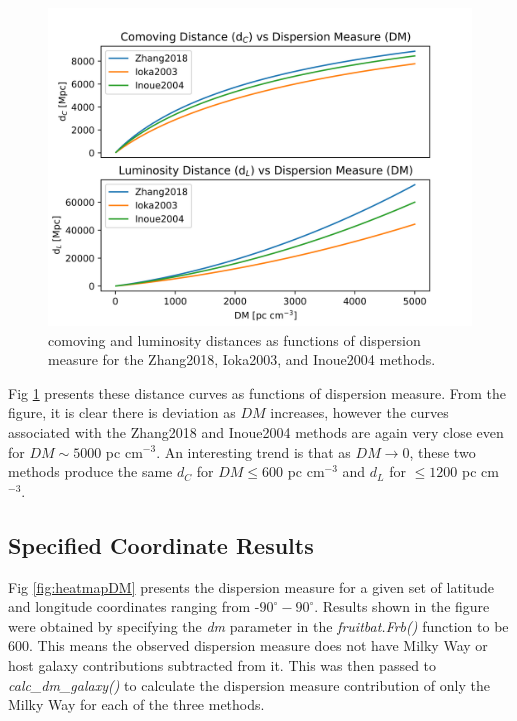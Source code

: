\documentclass{article}
\begin{document}
\begin{figure}[!htb]
\includegraphics[width=\linewidth]{distance_vs_DM.png}
\caption{comoving and luminosity distances as functions of dispersion measure for the Zhang2018, Ioka2003, and Inoue2004 methods. }
\label{fig:distance_v_DM}
\end{figure}

Fig \ref{fig:distance_v_DM} presents these distance curves as functions of dispersion measure. From the figure, it is clear there is deviation as $DM$ increases, however the curves associated with the Zhang2018 and Inoue2004 methods are again very close even for $DM\sim5000$ pc cm$^{-3}$. An interesting trend is that as $DM\rightarrow0$,  these two methods produce the same $d_C$ for $DM \leqslant 600$ pc cm$^{-3}$ and $d_L$ for $\leqslant 1200$ pc cm$^{-3}$.

\subsection{Specified Coordinate Results}

Fig \ref{fig:heatmapDM} presents the dispersion measure for a given set of latitude and longitude coordinates ranging from -$90^\circ-90^\circ$. Results shown in the figure were obtained by specifying the \emph{dm} parameter in the \emph{fruitbat.Frb()} function to be 600. This means the observed dispersion measure does not have Milky Way or host galaxy contributions subtracted from it. This was then passed to \emph{calc\_dm\_galaxy()} to calculate the dispersion measure contribution of only the Milky Way for each of the three methods.
\end{document}
